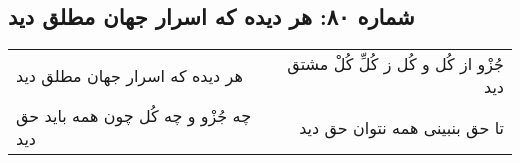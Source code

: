\begin{center}
\section*{شماره ۸۰: هر دیده که اسرار جهان مطلق دید}
\label{sec:080}
\begin{longtable}{l p{0.5cm} r}
هر دیده که اسرار جهان مطلق دید
&&
جُزْو از کُل و کُل ز کُلِّ کُلْ مشتق دید
\\
چه جُزْو و چه کُل چون همه باید حق دید
&&
تا حق بنبینی همه نتوان حق دید
\\
\end{longtable}
\end{center}
